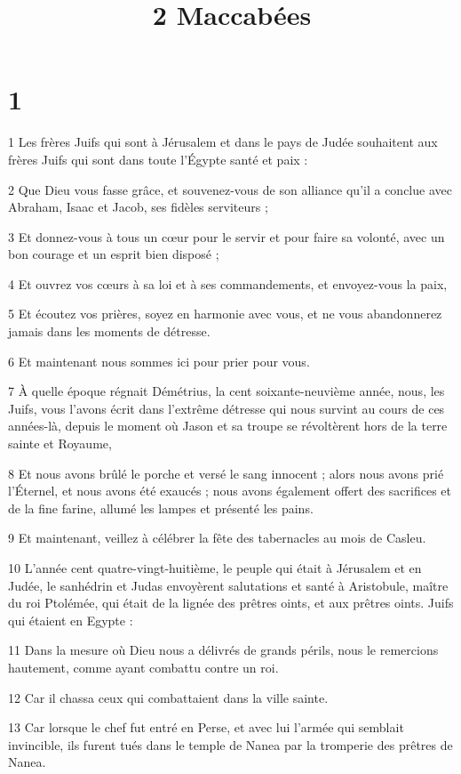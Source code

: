

\title{2 Maccabées}


\chapter{1}

\par 1 Les frères Juifs qui sont à Jérusalem et dans le pays de Judée souhaitent aux frères Juifs qui sont dans toute l'Égypte santé et paix :
\par 2 Que Dieu vous fasse grâce, et souvenez-vous de son alliance qu'il a conclue avec Abraham, Isaac et Jacob, ses fidèles serviteurs ;
\par 3 Et donnez-vous à tous un cœur pour le servir et pour faire sa volonté, avec un bon courage et un esprit bien disposé ;
\par 4 Et ouvrez vos cœurs à sa loi et à ses commandements, et envoyez-vous la paix,
\par 5 Et écoutez vos prières, soyez en harmonie avec vous, et ne vous abandonnerez jamais dans les moments de détresse.
\par 6 Et maintenant nous sommes ici pour prier pour vous.
\par 7 À quelle époque régnait Démétrius, la cent soixante-neuvième année, nous, les Juifs, vous l'avons écrit dans l'extrême détresse qui nous survint au cours de ces années-là, depuis le moment où Jason et sa troupe se révoltèrent hors de la terre sainte et Royaume,
\par 8 Et nous avons brûlé le porche et versé le sang innocent ; alors nous avons prié l'Éternel, et nous avons été exaucés ; nous avons également offert des sacrifices et de la fine farine, allumé les lampes et présenté les pains.
\par 9 Et maintenant, veillez à célébrer la fête des tabernacles au mois de Casleu.
\par 10 L'année cent quatre-vingt-huitième, le peuple qui était à Jérusalem et en Judée, le sanhédrin et Judas envoyèrent salutations et santé à Aristobule, maître du roi Ptolémée, qui était de la lignée des prêtres oints, et aux prêtres oints. Juifs qui étaient en Egypte :
\par 11 Dans la mesure où Dieu nous a délivrés de grands périls, nous le remercions hautement, comme ayant combattu contre un roi.
\par 12 Car il chassa ceux qui combattaient dans la ville sainte.
\par 13 Car lorsque le chef fut entré en Perse, et avec lui l'armée qui semblait invincible, ils furent tués dans le temple de Nanea par la tromperie des prêtres de Nanea.
